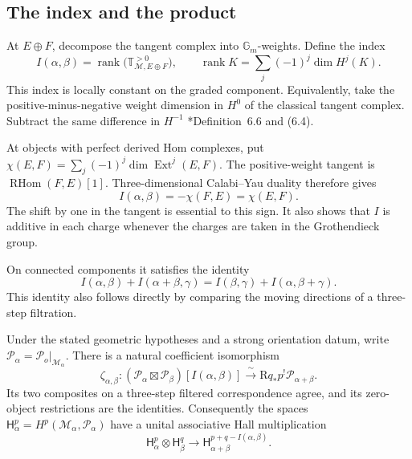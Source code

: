 \subsection{The index and the product}

At $E\oplus F$, decompose the tangent complex into
$\mathbb G_m$-weights. Define the index
\begin{equation}\label{cyhall:eq:index}
 I(\alpha,\beta)=
 \operatorname{rank}\bigl(\mathbb T_{\mathcal M,E\oplus F}^{>0}\bigr),
 \qquad
 \operatorname{rank}K=\sum_j(-1)^j\dim H^j(K).
\end{equation}
This index is locally constant on the graded component.
Equivalently, take the positive-minus-negative weight dimension
in $H^0$ of the classical tangent complex.
Subtract the same difference in $H^{-1}$
\cite{cyhall:KPS}*{Definition~6.6 and (6.4)}.

At objects with perfect derived Hom complexes, put
$\chi(E,F)=\sum_j(-1)^j\dim\operatorname{Ext}^j(E,F)$.
The positive-weight tangent is $\operatorname{RHom}(F,E)[1]$.
Three-dimensional Calabi--Yau duality therefore gives
\begin{equation}\label{cyhall:eq:index-euler}
            I(\alpha,\beta)=-\chi(F,E)=\chi(E,F).
\end{equation}
The shift by one in the tangent is essential to this sign.
It also shows that $I$ is additive in each charge whenever the
charges are taken in the Grothendieck group.

On connected components it satisfies the identity
\begin{equation}\label{cyhall:eq:cocycle}
 I(\alpha,\beta)+I(\alpha+\beta,\gamma)
 =I(\beta,\gamma)+I(\alpha,\beta+\gamma).
\end{equation}
This identity also follows directly by comparing the moving
directions of a three-step filtration.

\begin{theorem}
\label{cyhall:thm:coefficient}
Under the stated geometric hypotheses and a strong orientation
datum, write $\mathcal P_\alpha=\mathcal P_o|_{\mathcal M_\alpha}$.
There is a natural coefficient isomorphism
\begin{equation}\label{cyhall:eq:coefficient}
 \zeta_{\alpha,\beta}:
 (\mathcal P_\alpha\boxtimes\mathcal P_\beta)[I(\alpha,\beta)]
 \xrightarrow{\ \sim\ }\mathrm Rq_*p^!\mathcal P_{\alpha+\beta}.
\end{equation}
Its two composites on a three-step filtered correspondence agree,
and its zero-object restrictions are the identities.
Consequently the spaces
$\mathsf H_\alpha^p=H^p(\mathcal M_\alpha,\mathcal P_\alpha)$
have a unital associative Hall multiplication
\begin{equation}\label{cyhall:eq:critical-product}
 \mathsf H_\alpha^p\otimes\mathsf H_\beta^q
 \longrightarrow
 \mathsf H_{\alpha+\beta}^{p+q-I(\alpha,\beta)}.
\end{equation}
\end{theorem}

